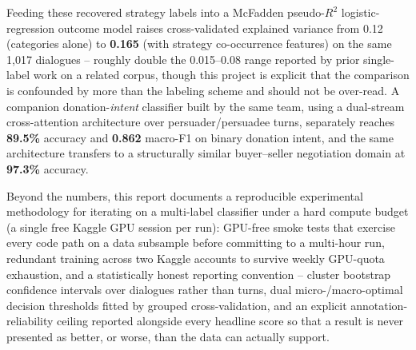 Feeding these recovered strategy labels into a McFadden pseudo-$R^2$
logistic-regression outcome model raises cross-validated explained variance
from 0.12 (categories alone) to \textbf{0.165} (with strategy co-occurrence
features) on the same 1{,}017 dialogues -- roughly double the 0.015--0.08
range reported by prior single-label work on a related corpus, though this
project is explicit that the comparison is confounded by more than the
labeling scheme and should not be over-read. A companion donation-\emph{intent}
classifier built by the same team, using a dual-stream cross-attention
architecture over persuader/persuadee turns, separately reaches
\textbf{89.5\%} accuracy and \textbf{0.862} macro-F1 on binary donation
intent, and the same architecture transfers to a structurally similar
buyer--seller negotiation domain at \textbf{97.3\%} accuracy.

Beyond the numbers, this report documents a reproducible experimental
methodology for iterating on a multi-label classifier under a hard compute
budget (a single free Kaggle GPU session per run): GPU-free smoke tests that
exercise every code path on a data subsample before committing to a
multi-hour run, redundant training across two Kaggle accounts to survive
weekly GPU-quota exhaustion, and a statistically honest reporting
convention -- cluster bootstrap confidence intervals over dialogues rather
than turns, dual micro-/macro-optimal decision thresholds fitted by
grouped cross-validation, and an explicit annotation-reliability ceiling
reported alongside every headline score so that a result is never presented
as better, or worse, than the data can actually support.

